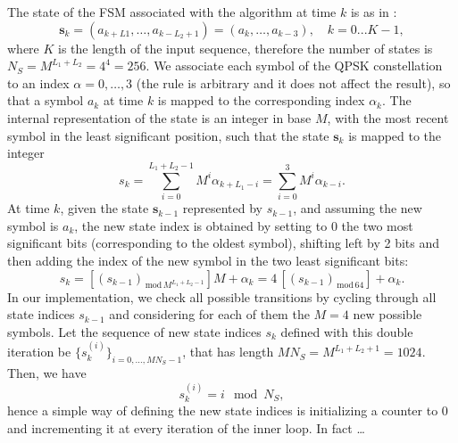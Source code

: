 \documentclass[10pt]{article}
\newcommand{\lmod}[1] {_{\,\mathrm{mod}\,#1}}
\begin{document}
The state of the FSM associated with the algorithm at time $k$ is as in \cite{bc}:
\begin{equation}
\mathbf{s}_k = (a_{k+L1}, \ldots, a_{k-L_2+1}) = (a_k, \ldots, a_{k-3}), \quad k=0...K-1,
\end{equation}
where $K$ is the length of the input sequence, therefore the number of states is $N_S = M ^ {L_1 + L_2} = 4^4 = 256$. We associate each symbol of the QPSK constellation to an index $\alpha = 0,\ldots,3$ (the rule is arbitrary and it does not affect the result), so that a symbol $a_k$ at time $k$ is mapped to the corresponding index $\alpha_k$. The internal representation of the state is an integer in base $M$, with the most recent symbol in the least significant position, such that the state $\mathbf{s}_k$ is mapped to the integer
\begin{equation}
s_k = \sum_{i=0}^{L_1+L_2-1} M^i \alpha_{k+L_1-i} = \sum_{i=0}^{3} M^i \alpha_{k-i}.
\end{equation}
At time $k$, given the state $\mathbf{s}_{k-1}$ represented by $s_{k-1}$, and assuming the new symbol is $a_k$, the new state index is obtained by setting to 0 the two most significant bits (corresponding to the oldest symbol), shifting left by 2 bits and then adding the index of the new symbol in the two least significant bits:
\begin{equation}
s_k = \left[ (s_{k-1}) \lmod{M^{L_1+L_2-1}} \right] M + \alpha_k = 4 \, \left[ (s_{k-1})\lmod{64} \right] + \alpha_k.
\end{equation}
In our implementation, we check all possible transitions by cycling through all state indices $s_{k-1}$ and considering for each of them the $M=4$ new possible symbols. Let the sequence of new state indices $s_k$ defined with this double iteration be $\{ s_k^{(i)} \}_{i=0,\ldots,MN_S-1}$, that has length $MN_S = M^{L_1+L_2+1} = 1024$.  Then, we have
\begin{equation}
s_k^{(i)} = i \mod N_S,
\end{equation}
hence a simple way of defining the new state indices is initializing a counter to 0 and incrementing it at every iteration of the inner loop. In fact \ldots %
\end{document}
